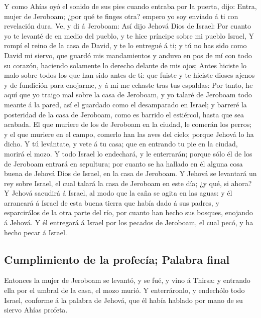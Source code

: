  Y como Ahías oyó el sonido de sus pies cuando entraba por
la puerta, dijo: Entra, mujer de Jeroboam; ¿por qué te finges otra?
empero yo soy enviado á ti con revelación dura.  Ve, y di
á Jeroboam: Así dijo Jehová Dios de Israel: Por cuanto yo te levanté de
en medio del pueblo, y te hice príncipe sobre mi pueblo Israel,
 Y rompí el reino de la casa de David, y te lo entregué á
ti; y tú no has sido como David mi siervo, que guardó mis mandamientos y
anduvo en pos de mí con todo su corazón, haciendo solamente lo derecho
delante de mis ojos;  Antes hiciste lo malo sobre todos
los que han sido antes de ti: que fuiste y te hiciste dioses ajenos y de
fundición para enojarme, y á mí me echaste tras tus espaldas:
 Por tanto, he aquí que yo traigo mal sobre la casa de
Jeroboam, y yo talaré de Jeroboam todo meante á la pared, así el
guardado como el desamparado en Israel; y barreré la posteridad de la
casa de Jeroboam, como es barrido el estiércol, hasta que sea acabada.
 El que muriere de los de Jeroboam en la ciudad, le
comerán los perros; y el que muriere en el campo, comerlo han las aves
del cielo; porque Jehová lo ha dicho.  Y tú levántate, y
vete á tu casa; que en entrando tu pie en la ciudad, morirá el mozo.
 Y todo Israel lo endechará, y le enterrarán; porque sólo
él de los de Jeroboam entrará en sepultura; por cuanto se ha hallado en
él alguna cosa buena de Jehová Dios de Israel, en la casa de Jeroboam.
 Y Jehová se levantará un rey sobre Israel, el cual
talará la casa de Jeroboam en este día; ¿y qué, si ahora?
 Y Jehová sacudirá á Israel, al modo que la caña se agita
en las aguas: y él arrancará á Israel de esta buena tierra que había
dado á sus padres, y esparcirálos de la otra parte del río, por cuanto
han hecho sus bosques, enojando á Jehová.  Y él entregará
á Israel por los pecados de Jeroboam, el cual pecó, y ha hecho pecar á
Israel.

\hypertarget{cumplimiento-de-la-profecuxeda-palabra-final}{%
\subsection{Cumplimiento de la profecía; Palabra
final}\label{cumplimiento-de-la-profecuxeda-palabra-final}}

 Entonces la mujer de Jeroboam se levantó, y se fué, y
vino á Thirsa: y entrando ella por el umbral de la casa, el mozo murió.
 Y enterráronlo, y endechólo todo Israel, conforme á la
palabra de Jehová, que él había hablado por mano de su siervo Ahías
profeta.

